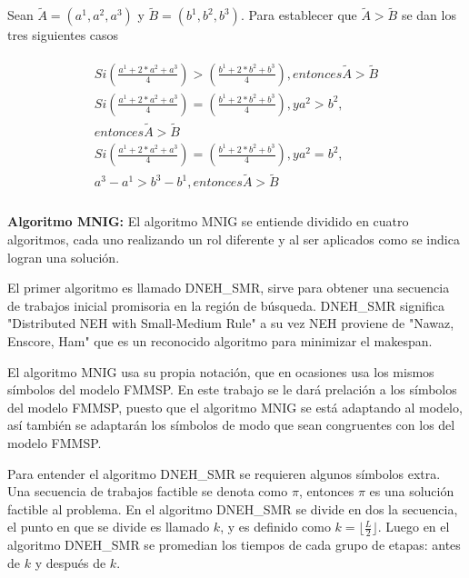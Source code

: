 \documentclass{article}
\begin{document}
Sean $\tilde{A} = (a^1,a^2,a^3)$ y $\tilde{B} = (b^1,b^2,b^3)$. Para establecer
que $\tilde{A} > \tilde{B}$ se dan los tres siguientes casos

\begin{align}
\begin{split}
    Si \left(\frac{a^1+2*a^2+a^3}{4}\right) > 
    \left(\frac{b^1+2*b^2+b^3}{4}\right), entonces \tilde{A} > \tilde{B}\\
    Si \left(\frac{a^1+2*a^2+a^3}{4}\right) = \left(\frac{b^1+2*b^2+b^3}{4}\right),
    y a^2 > b^2,\\ entonces \tilde{A} > \tilde{B}\\
    Si \left(\frac{a^1+2*a^2+a^3}{4}\right) = \left(\frac{b^1+2*b^2+b^3}{4}\right),
    y a^2 = b^2,\\ a^3-a^1 > b^3-b^1, entonces \tilde{A} > \tilde{B}\\
\end{split}
\end{align}

\vspace{\baselineskip}
\textbf{Algoritmo MNIG:} El algoritmo MNIG se entiende dividido en cuatro
algoritmos, cada uno realizando un rol diferente y al ser aplicados como se
indica logran una solución. \autocite{algMNIG}

\vspace{\baselineskip}
El primer algoritmo es llamado DNEH\_SMR, sirve para obtener una secuencia de
trabajos inicial promisoria en la región de búsqueda. DNEH\_SMR significa
"Distributed NEH with Small-Medium Rule" a su vez NEH proviene de "Nawaz,
Enscore, Ham" que es un reconocido algoritmo para minimizar el makespan.
\autocite{algMNIG}

\vspace{\baselineskip}
El algoritmo MNIG usa su propia notación, que en ocasiones usa los mismos
símbolos del modelo FMMSP. En este trabajo se le dará prelación a los símbolos
del modelo FMMSP, puesto que el algoritmo MNIG se está adaptando al modelo, así
también se adaptarán los símbolos de modo que sean congruentes con los del
modelo FMMSP.

\vspace{\baselineskip}
Para entender el algoritmo DNEH\_SMR se requieren algunos símbolos extra. Una
secuencia de trabajos factible se denota como $\pi$, entonces $\pi$ es una 
solución
factible al problema. En el algoritmo DNEH\_SMR se divide en dos la secuencia,
el punto en que se divide es llamado $k$, y es definido como $k = \lfloor
\frac{L}{2}\rfloor$. Luego en el algoritmo DNEH\_SMR se promedian los tiempos
de cada grupo de etapas: antes de $k$ y después de $k$. \autocite{algMNIG}
\end{document}
